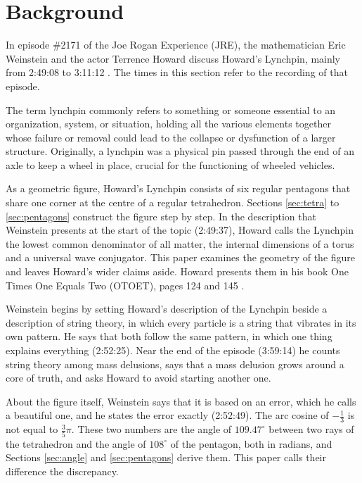 \documentclass[a4paper,12pt]{article}
\begin{document}
\thispagestyle{empty}

\onehalfspacing

\pagestyle{fancy}
\fancyhf{}
\fancyhead[C]{\thepage}


\section{Background}
In episode \#2171 of the Joe Rogan Experience (JRE), the mathematician Eric Weinstein and the actor Terrence Howard discuss Howard's Lynchpin, mainly from 2:49:08 to 3:11:12 \cite{joe-rogan}. The times in this section refer to the recording of that episode.

The term lynchpin commonly refers to something or someone essential to an organization, system, or situation, holding all the various elements together whose failure or removal could lead to the collapse or dysfunction of a larger structure. Originally, a lynchpin was a physical pin passed through the end of an axle to keep a wheel in place, crucial for the functioning of wheeled vehicles.

As a geometric figure, Howard's Lynchpin consists of six regular pentagons that share one corner at the centre of a regular tetrahedron. Sections \ref{sec:tetra} to \ref{sec:pentagons} construct the figure step by step. In the description that Weinstein presents at the start of the topic (2:49:37), Howard calls the Lynchpin the lowest common denominator of all matter, the internal dimensions of a torus and a universal wave conjugator. This paper examines the geometry of the figure and leaves Howard's wider claims aside. Howard presents them in his book One Times One Equals Two (OTOET), pages 124 and 145 \cite{ebook}.

Weinstein begins by setting Howard's description of the Lynchpin beside a description of string theory, in which every particle is a string that vibrates in its own pattern. He says that both follow the same pattern, in which one thing explains everything (2:52:25). Near the end of the episode (3:59:14) he counts string theory among mass delusions, says that a mass delusion grows around a core of truth, and asks Howard to avoid starting another one.

About the figure itself, Weinstein says that it is based on an error, which he calls a beautiful one, and he states the error exactly (2:52:49). The arc cosine of \( -\frac{1}{3} \) is not equal to \( \frac{3}{5}\pi \). These two numbers are the angle of \( 109.47^\circ \) between two rays of the tetrahedron and the angle of \( 108^\circ \) of the pentagon, both in radians, and Sections \ref{sec:angle} and \ref{sec:pentagons} derive them. This paper calls their difference the discrepancy.
\end{document}
